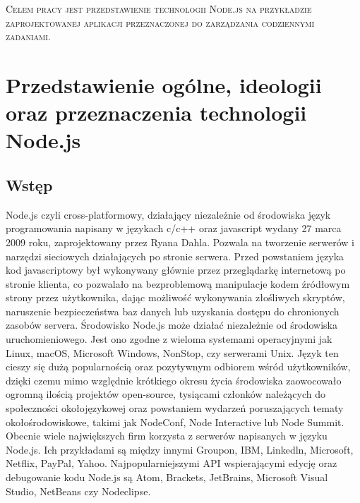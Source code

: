 \documentclass[12pt]{report}
\begin{document}
\begin{titlepage}
	\centering
	{\scshape\LARGE Celem pracy jest przedstawienie technologii Node.js na przykładzie zaprojektowanej aplikacji przeznaczonej do zarządzania codziennymi zadaniami.  \par}
\end{titlepage}
\tableofcontents

\chapter{Przedstawienie ogólne, ideologii oraz przeznaczenia technologii Node.js}

\section{Wstęp}
Node.js czyli cross-platformowy, działający niezależnie od środowiska język programowania napisany w językach c/c++ oraz javascript wydany 27 marca 2009 roku, zaprojektowany przez Ryana Dahla. 
Pozwala na tworzenie serwerów i narzędzi sieciowych działających po stronie serwera. 
Przed powstaniem języka kod javascriptowy był wykonywany głównie przez przeglądarkę internetową po stronie klienta, co pozwalało na bezproblemową manipulacje kodem źródłowym strony przez użytkownika, dając możliwość wykonywania złośliwych skryptów, naruszenie bezpieczeństwa baz danych lub uzyskania dostępu do chronionych zasobów servera. 
Środowisko Node.js może działać niezależnie od środowiska uruchomieniowego. 
Jest ono zgodne z wieloma systemami operacyjnymi jak  Linux, macOS, Microsoft Windows, NonStop, czy serwerami Unix. 
Język ten cieszy się dużą popularnością oraz pozytywnym odbiorem wśród użytkowników, dzięki czemu mimo względnie krótkiego okresu życia środowiska zaowocowało ogromną ilością projektów open-source, tysiącami członków należących do społeczności okołojęzykowej oraz powstaniem wydarzeń poruszających tematy okołośrodowiskowe, takimi jak NodeConf, Node Interactive lub Node Summit. 
Obecnie wiele największych firm korzysta z serwerów napisanych w języku Node.js. 
Ich przykładami są między innymi Groupon, IBM, Linkedln, Microsoft, Netflix, PayPal, Yahoo. 
Najpopularniejszymi API wspierającymi edycję oraz debugowanie kodu Node.js są Atom, Brackets, JetBrains, Microsoft Visual Studio, NetBeans czy Nodeclipse.
\end{document}
